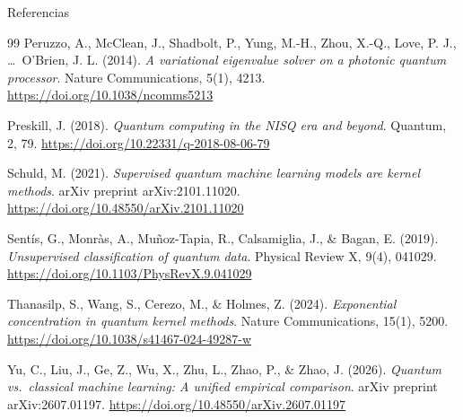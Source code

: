 \documentclass[aspectratio=169,10pt,professionalfonts]{beamer}
\begin{document}
\begin{frame}[allowframebreaks]{Referencias}
\begin{thebibliography}{99}
	Peruzzo, A., McClean, J., Shadbolt, P., Yung, M.-H., Zhou, X.-Q., Love, P. J., \ldots\ O'Brien, J. L. (2014).
	\emph{A variational eigenvalue solver on a photonic quantum processor}.
	Nature Communications, 5(1), 4213.
	\url{https://doi.org/10.1038/ncomms5213}

	Preskill, J. (2018).
	\emph{Quantum computing in the NISQ era and beyond}.
	Quantum, 2, 79.
	\url{https://doi.org/10.22331/q-2018-08-06-79}

	Schuld, M. (2021).
	\emph{Supervised quantum machine learning models are kernel methods}.
	arXiv preprint arXiv:2101.11020.
	\url{https://doi.org/10.48550/arXiv.2101.11020}

	Sent\'is, G., Monr\`as, A., Mu\~noz-Tapia, R., Calsamiglia, J., \& Bagan, E. (2019).
	\emph{Unsupervised classification of quantum data}.
	Physical Review X, 9(4), 041029.
	\url{https://doi.org/10.1103/PhysRevX.9.041029}

	Thanasilp, S., Wang, S., Cerezo, M., \& Holmes, Z. (2024).
	\emph{Exponential concentration in quantum kernel methods}.
	Nature Communications, 15(1), 5200.
	\url{https://doi.org/10.1038/s41467-024-49287-w}

	Yu, C., Liu, J., Ge, Z., Wu, X., Zhu, L., Zhao, P., \& Zhao, J. (2026).
	\emph{Quantum vs.\ classical machine learning: A unified empirical comparison}.
	arXiv preprint arXiv:2607.01197.
	\url{https://doi.org/10.48550/arXiv.2607.01197}
\end{thebibliography}
\end{frame}
\end{document}
